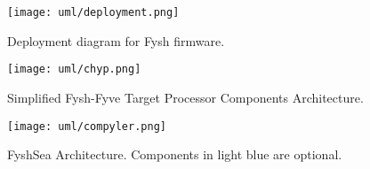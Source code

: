 \begin{figure}[h]
	\centering
	\texttt{[image: uml/deployment.png]}
	\caption{Deployment diagram for Fysh firmware.}
	\label{fig:deployment}
\end{figure}

\begin{figure}[h]
	\centering
	\texttt{[image: uml/chyp.png]}
	\caption{Simplified Fysh-Fyve Target Processor Components Architecture.}
	\label{fig:component}
\end{figure}

\begin{figure}[h]
	\centering
	\texttt{[image: uml/compyler.png]}
	\caption{FyshSea Architecture. Components in light blue are optional.}
	\label{fig:component}
\end{figure}

